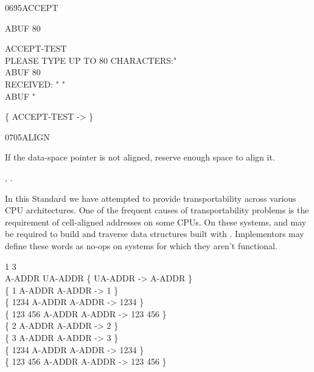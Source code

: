 \begin{worddef}{0695}{ACCEPT}
\begin{defer}
	\testing
		 ABUF 80  

		\word{:} ACCEPT-TEST \\
		\tab[2]   PLEASE TYPE UP TO 80 CHARACTERS:"  \\
		\tab[2] ABUF 80  \\
		\tab[2]   RECEIVED: " \word{[CHAR]} "  \\
		\tab[2] ABUF   \word{[CHAR]} "   \\
		\word{;}

		\{ ACCEPT-TEST -> \}
	\end{defer}
\end{worddef}


\begin{worddef}{0705}{ALIGN}
\item \stack{}{}

	If the data-space pointer is not aligned, reserve enough space
	to align it.

\see {},
	.

	\begin{defer}
	\rationale %
		In this Standard we have attempted to provide transportability
		across various CPU architectures. One of the frequent causes
		of transportability problems is the requirement of cell-aligned
		addresses on some CPUs. On these systems,  and
		 may be required to build and traverse data
		structures built with . Implementors may define these
		words as no-ops on systems for which they aren't functional.

	\testing
		  1      3   \\
		 A-ADDR   UA-ADDR
		\{ UA-ADDR  -> A-ADDR \} \\
		\{       1 A-ADDR                 A-ADDR               ->       1 \} \\
		\{    1234 A-ADDR \word{!}                 A-ADDR                ->    1234 \} \\
		\{ 123 456 A-ADDR                 A-ADDR               -> 123 456 \} \\
		\{       2 A-ADDR     A-ADDR   ->       2 \} \\
		\{       3 A-ADDR     A-ADDR   ->       3 \} \\
		\{    1234 A-ADDR  \word{!}    A-ADDR    ->    1234 \} \\
		\{ 123 456 A-ADDR     A-ADDR   -> 123 456 \}
	\end{defer}
\end{worddef}


